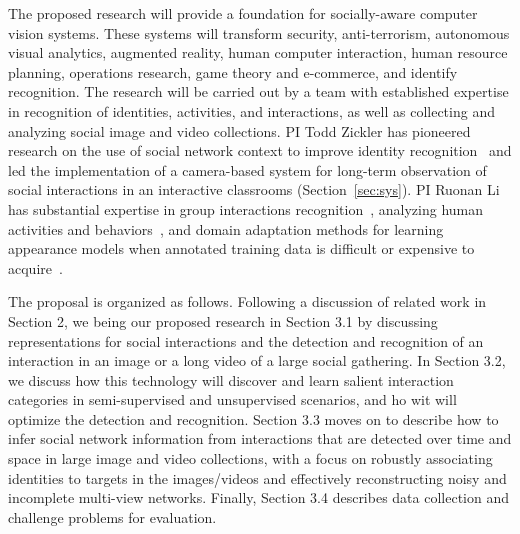 The proposed research will provide a foundation for socially-aware computer vision systems. These systems will transform security, anti-terrorism, autonomous visual analytics, augmented reality, human computer interaction, human resource planning, operations research, game theory and e-commerce, and identify recognition. The research will be carried out by a team with established expertise in recognition of identities, activities, and interactions, as well as collecting and analyzing social image and video collections. PI Todd Zickler has pioneered research on the use of social network context to improve identity recognition~\cite{Stone2008,Stone2010} and led the implementation of a camera-based system for long-term observation of social interactions in an interactive classrooms (Section~\ref{sec:sys}). PI Ruonan Li has substantial expertise in group interactions recognition~\cite{LiIJCV2012}, analyzing human activities and behaviors~\cite{Li2010,LiPAMI2012}, and domain adaptation methods for learning appearance models when annotated training data is difficult or expensive to acquire~\cite{LiZickler2012,Li2011}. 

The proposal is organized as follows. Following a discussion of related work in Section 2, we being our proposed research in Section 3.1 by discussing representations for social interactions and the detection and recognition of an interaction in an image or a long video of a large social gathering. In Section 3.2, we discuss how this technology will  discover and learn salient interaction categories in semi-supervised and unsupervised scenarios, and ho wit will optimize the detection and recognition. Section 3.3 moves on to describe how to infer social network information from interactions that are detected over time and space in large image and video collections, with a focus on robustly associating identities to targets in the images/videos and effectively reconstructing noisy and incomplete multi-view networks. Finally, Section 3.4 describes data collection and challenge problems for evaluation.



